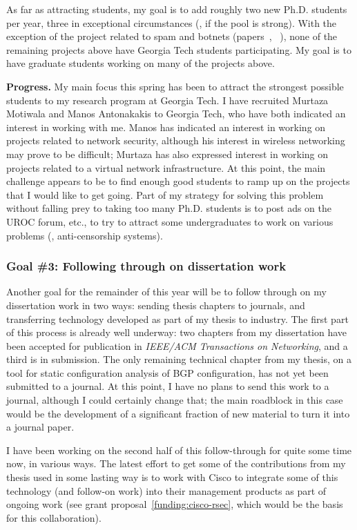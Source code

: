 As far as attracting students, my goal is to add roughly two new
Ph.D. students per year, three in exceptional circumstances (\ie, if the
pool is strong).  With the exception of the project related to spam and
botnets (papers~,
~), none of the remaining projects above
have Georgia Tech students participating.  My goal is to have graduate
students working on many of the projects above.

{\bf Progress.}  My main focus this spring has been to attract the
strongest possible students to my research program at Georgia Tech.  I
have recruited Murtaza Motiwala and Manos Antonakakis to Georgia Tech,
who have both indicated an interest in working with me.  Manos has
indicated an interest in working on projects related to network
security, although his interest in wireless networking may prove to be
difficult; Murtaza has also expressed interest in working on projects
related to a virtual network infrastructure.  At this point, the main
challenge appears to be to find enough good students to ramp up on the
projects that I would like to get going.  Part of my strategy for
solving this problem without falling prey to taking too many
Ph.D. students is to post ads on the UROC forum, etc., to try to attract
some undergraduates to work on various problems (\eg, anti-censorship
systems).

\subsubsection*{Goal \#3: Following through on dissertation work}

Another goal for the remainder of this year will be to follow through on
my dissertation work in two ways: sending thesis chapters to journals,
and transferring technology developed as part of my thesis to industry.
The first part of this process is already well underway: two chapters
from my dissertation have been accepted for publication in {\em IEEE/ACM
Transactions on Networking}, and a third is in submission.  The only
remaining technical chapter from my thesis, on a tool for static
configuration analysis of BGP configuration, has not yet been submitted
to a journal.  At this point, I have no plans to send this work to a
journal, although I could certainly change that; the main roadblock in
this case would be the development of a significant fraction of new
material to turn it into a journal paper.

I have been working on the second half of this follow-through for quite
some time now, in various ways.  The latest effort to get some of the
contributions from my thesis used in some lasting way is to work with
Cisco to integrate some of this technology (and follow-on work) into
their management products as part of ongoing work (see grant
proposal~\ref{funding:cisco-rsec}, which would be the basis for this
collaboration). 
